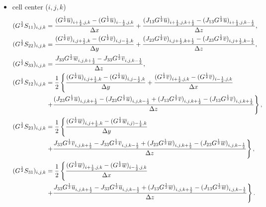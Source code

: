 \begin{itemize}
  \item cell center ($i,j,k$)
    \begin{align}
      (G^{\frac{1}{2}}S_{11})_{i,j,k} &=
      \frac{(G^{\frac{1}{2}}\overline{u})_{i+\half,j,k}-(G^{\frac{1}{2}}\overline{u})_{i-\half,j,k}}{\Delta x}
     +\frac{(J_{13}G^{\frac{1}{2}}\overline{u})_{i+\half,j,k+\half}-(J_{13}G^{\frac{1}{2}}\overline{u})_{i+\half,j,k-\half}}{\Delta z}, \\
     (G^{\frac{1}{2}}S_{22})_{i,j,k} &=
      \frac{(G^{\frac{1}{2}}\overline{v})_{i,j+\half,k}-(G^{\frac{1}{2}}\overline{v})_{i,j-\half,k}}{\Delta y}
     +\frac{(J_{23}G^{\frac{1}{2}}\overline{v})_{i,j+\half,k+\half}-(J_{23}G^{\frac{1}{2}}\overline{v})_{i,j+\half,k-\half}}{\Delta z}, \\
     (G^{\frac{1}{2}}S_{33})_{i,j,k} &=
      \frac{J_{33}G^{\frac{1}{2}}\overline{w}_{i,j,k+\frac{1}{2}}-J_{33}G^{\frac{1}{2}}\overline{v}_{i,j,k-\frac{1}{2}}}{\Delta z}, \\
      (G^{\frac{1}{2}}S_{12})_{i,j,k} &= \frac{1}{2}\left\{
      \frac{(G^{\frac{1}{2}}\overline{u})_{i,j+\frac{1}{2},k}-(G^{\frac{1}{2}}\overline{u})_{i,j-\frac{1}{2},k}}{\Delta y}
     +\frac{(G^{\frac{1}{2}}\overline{v})_{i+\frac{1}{2},j,k}-(G^{\frac{1}{2}}\overline{v})_{i-\frac{1}{2},j,k}}{\Delta x}  \right.\nonumber \\ &\left.
     +\frac{(J_{23}G^{\frac{1}{2}}\overline{u})_{i,j,k+\half}-(J_{23}G^{\frac{1}{2}}\overline{u})_{i,j,k-\half} + (J_{13}G^{\frac{1}{2}}\overline{v})_{i,j,k+\half}-(J_{13}G^{\frac{1}{2}}\overline{v})_{i,j,k+\half}}{\Delta z}
      \right\}, \\
      (G^{\frac{1}{2}}S_{23})_{i,j,k} &= \frac{1}{2}\left\{
      \frac{(G^{\frac{1}{2}}\overline{w})_{i,j+\frac{1}{2},k}-(G^{\frac{1}{2}}\overline{w}_{i,j)-\frac{1}{2},k}}{\Delta y} \right. \nonumber \\ & \left.
      + \frac{J_{33}G^{\frac{1}{2}}\overline{v}_{i,j,k+\frac{1}{2}}-J_{33}G^{\frac{1}{2}}\overline{v}_{i,j,k-\frac{1}{2}} + (J_{23}G^{\frac{1}{2}}\overline{w})_{i,j,k+\half}-(J_{23}G^{\frac{1}{2}}\overline{w})_{i,j,k-\half}}{\Delta z}
      \right\}, \\
      (G^{\frac{1}{2}}S_{31})_{i,j,k} &= \frac{1}{2}\left\{
      \frac{(G^{\frac{1}{2}}\overline{w})_{i+\frac{1}{2},j,k}-(G^{\frac{1}{2}}\overline{w})_{i-\frac{1}{2},j,k}}{\Delta x} \right. \nonumber \\ & \left.
     +\frac{J_{33}G^{\frac{1}{2}}\overline{u}_{i,j,k+\frac{1}{2}}-J_{33}G^{\frac{1}{2}}\overline{u}_{i,j,k-\frac{1}{2}} + (J_{13}G^{\frac{1}{2}}\overline{w})_{i,j,k+\half}-(J_{13}G^{\frac{1}{2}}\overline{w})_{i,j,k-\half}}{\Delta z}
      \right\}.
    \end{align}


\end{itemize}
